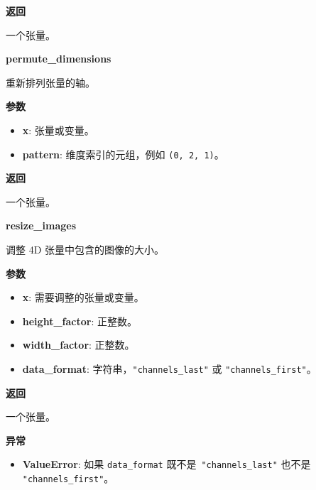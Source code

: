 \textbf{返回}

一个张量。


\textbf{permute\_dimensions}\label{permuteux5fdimensions}

\begin{Shaded}
\begin{Highlighting}[]
\end{Highlighting}
\end{Shaded}

重新排列张量的轴。

\textbf{参数}

\begin{itemize}
\tightlist
\item
  \textbf{x}: 张量或变量。
\item
  \textbf{pattern}: 维度索引的元组，例如 \texttt{(0,\ 2,\ 1)}。
\end{itemize}

\textbf{返回}

一个张量。


\textbf{resize\_images}\label{resizeux5fimages}

\begin{Shaded}
\begin{Highlighting}[]
\end{Highlighting}
\end{Shaded}

调整 4D 张量中包含的图像的大小。

\textbf{参数}

\begin{itemize}
\tightlist
\item
  \textbf{x}: 需要调整的张量或变量。
\item
  \textbf{height\_factor}: 正整数。
\item
  \textbf{width\_factor}: 正整数。
\item
  \textbf{data\_format}: 字符串，\texttt{"channels\_last"} 或
  \texttt{"channels\_first"}。
\end{itemize}

\textbf{返回}

一个张量。

\textbf{异常}

\begin{itemize}
\tightlist
\item
  \textbf{ValueError}: 如果 \texttt{data\_format}
  既不是~\texttt{"channels\_last"} 也不是 \texttt{"channels\_first"}。
\end{itemize}


